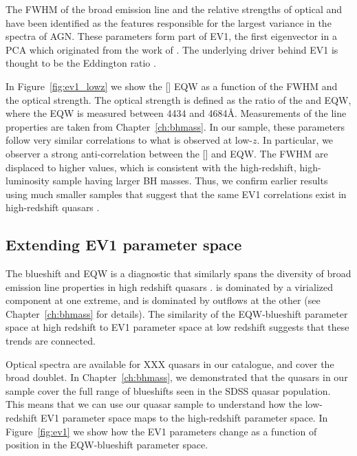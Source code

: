 The FWHM of the broad \hb emission line and the relative strengths of optical  and \hb have been identified as the features responsible for the largest variance in the spectra of AGN. 
These parameters form part of EV1, the first eigenvector in a PCA which originated from the work of \citet{boroson92}.   
The underlying driver behind EV1 is thought to be the Eddington ratio \citep[e.g.][]{sulentic00b,shen14}.

In Figure~\ref{fig:ev1_lowz} we show the [] EQW as a function of the \hb FWHM and the optical  strength. 
The optical  strength is defined as the ratio of the  and \hb EQW, where the  EQW is measured between 4434 and 4684\AA.
Measurements of the \hb line properties are taken from Chapter~\ref{ch:bhmass}. 
In our sample, these parameters follow very similar correlations to what is observed at low-$z$.
In particular, we observer a strong anti-correlation between the [] and  EQW.  
The \hb FWHM are displaced to higher values, which is consistent with the high-redshift, high-luminosity sample having larger BH masses. 
Thus, we confirm earlier results using much smaller samples that suggest that the same EV1 correlations exist in high-redshift quasars \citep[e.g.][]{sulentic04,sulentic06,runnoe13,shen16a}. 

\subsection{Extending EV1 parameter space}

The  blueshift and EQW is a diagnostic that similarly spans the diversity of broad emission line properties in high redshift quasars \citep{sulentic07,richards11}. 
 is dominated by a virialized component at one extreme, and is dominated by outflows at the other (see Chapter~\ref{ch:bhmass} for details). 
The similarity of the  EQW-blueshift parameter space at high redshift to EV1 parameter space at low redshift suggests that these trends are connected. 

Optical spectra are available for XXX quasars in our catalogue, and cover the broad  doublet. 
In Chapter~\ref{ch:bhmass}, we demonstrated that the quasars in our sample cover the full range of  blueshifts seen in the SDSS quasar population. 
This means that we can use our quasar sample to understand how the low-redshift EV1 parameter space maps to the high-redshift  parameter space.  
In Figure~\ref{fig:ev1} we show how the EV1 parameters change as a function of position in the  EQW-blueshift parameter space.

